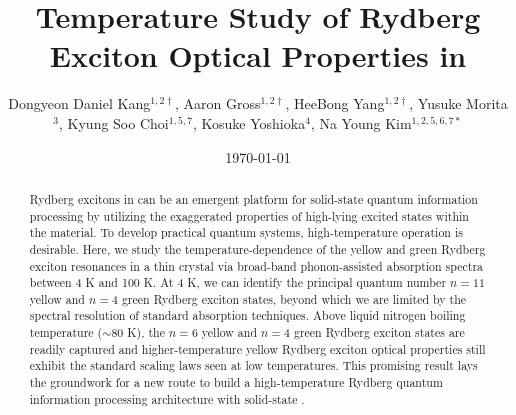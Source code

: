 \documentclass[aps,reprint,amsmath,amssymb,prb]{revtex4-1}
\begin{document}
\title{Temperature Study of Rydberg Exciton Optical Properties in 
}

\author{Dongyeon Daniel Kang$^{1,2\dagger}$, Aaron Gross$^{1,2\dagger}$, HeeBong Yang$^{1,2\dagger}$, Yusuke Morita$^{3}$,  Kyung Soo Choi$^{1,5,7}$, Kosuke Yoshioka$^{4}$, Na Young Kim$^{1,2,5,6,7*}$}
\address{$^1$Institute for Quantum Computing,  University of Waterloo, 200 University Ave. West, Waterloo, ON, N2L 3G1, Canada}
\address{$^2$Department of Electrical and Computer Engineering,  University of Waterloo, 200 University Ave. West, Waterloo, ON, N2L 3G1, Canada}
\address{$^3$Department of Physics, Graduate School of Science, The University of Tokyo, 7-3-1 Hongo, Bunkyo-ku, Tokyo, 113-0033, Japan}
\address{$^4$Photon Science Center, School of Engineering, The University of Tokyo, 2-11-16 Yayoi, Bunkyo-ku, Tokyo, 113-8656, Japan}
\address{$^5$Department of Physics and Astronomy,  University of Waterloo, 200 University Ave. West, Waterloo, ON, N2L 3G1, Canada}
\address{$^6$Department of Chemistry,  University of Waterloo, 200 University Ave. West, Waterloo, ON, N2L 3G1, Canada}
\address{$^7$Perimeter Institute for Theoretical Physics, 31 Caroline St. N, Waterloo, ON, N2L 2Y5, Canada}

\date{\today}

\begin{abstract}
Rydberg excitons in  can be an emergent platform for solid-state quantum information processing by utilizing the exaggerated properties of high-lying excited states within the material. To develop practical quantum systems, high-temperature operation is desirable. Here, we study the temperature-dependence of the yellow and green Rydberg exciton resonances in a thin  crystal via broad-band phonon-assisted absorption spectra between 4 K and 100 K. 
At 4 K, we can identify the principal quantum number $n=11$ yellow and $n=4$ green Rydberg exciton states, beyond which we are limited by the spectral resolution of standard absorption techniques.
Above liquid nitrogen boiling temperature ($\sim$80 K), the $n=6$ yellow and $n=4$ green Rydberg exciton states are readily captured 
and higher-temperature yellow Rydberg exciton optical properties still exhibit the standard scaling laws seen at low temperatures.
This promising result lays the groundwork for a new route to build a high-temperature Rydberg quantum information processing architecture with solid-state .
\end{abstract}
\maketitle 
\end{document}
